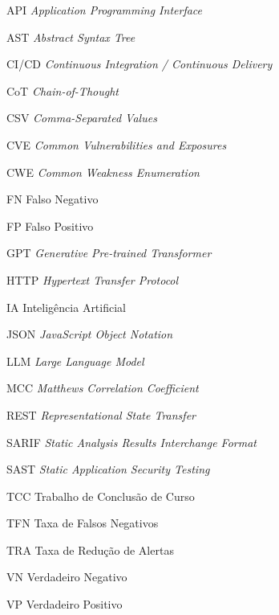 \begin{siglas}
\item[API] \textit{Application Programming Interface}
\item[AST] \textit{Abstract Syntax Tree}
\item[CI/CD] \textit{Continuous Integration / Continuous Delivery}
\item[CoT] \textit{Chain-of-Thought}
\item[CSV] \textit{Comma-Separated Values}
\item[CVE] \textit{Common Vulnerabilities and Exposures}
\item[CWE] \textit{Common Weakness Enumeration}
\item[FN] Falso Negativo
\item[FP] Falso Positivo
\item[GPT] \textit{Generative Pre-trained Transformer}
\item[HTTP] \textit{Hypertext Transfer Protocol}
\item[IA] Inteligência Artificial
\item[JSON] \textit{JavaScript Object Notation}
\item[LLM] \textit{Large Language Model}
\item[MCC] \textit{Matthews Correlation Coefficient}
\item[REST] \textit{Representational State Transfer}
\item[SARIF] \textit{Static Analysis Results Interchange Format}
\item[SAST] \textit{Static Application Security Testing}
\item[TCC] Trabalho de Conclusão de Curso
\item[TFN] Taxa de Falsos Negativos
\item[TRA] Taxa de Redução de Alertas
\item[VN] Verdadeiro Negativo
\item[VP] Verdadeiro Positivo
\end{siglas}